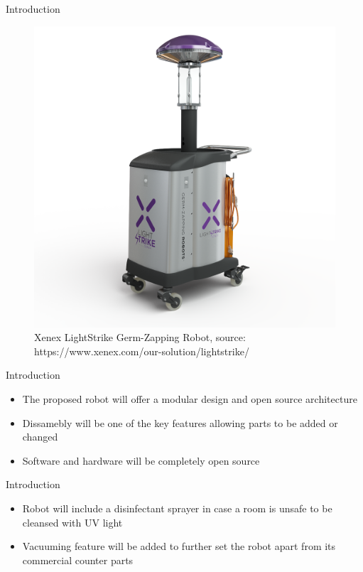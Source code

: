 \documentclass{beamer}
\begin{document}
\begin{frame}{Introduction}{}
\begin{figure}
	\centering
	\includegraphics[scale=0.15]{figs/img/xenexLightstrike}
	\caption{Xenex LightStrike Germ-Zapping Robot, source: https://www.xenex.com/our-solution/lightstrike/}
\end{figure}
\end{frame}

\begin{frame}{Introduction}{}
\begin{itemize}
	\item The proposed robot will offer a modular design and open source architecture
	\item Dissamebly will be one of the key features allowing parts to be added or changed
	\item Software and hardware will be completely open source
\end{itemize}
\end{frame}

\begin{frame}{Introduction}{}
\begin{itemize}
	\item Robot will include a disinfectant sprayer in case a room is unsafe to be cleansed with UV light
	\item Vacuuming feature will be added to further set the robot apart from its commercial counter parts
\end{itemize}
\end{frame}
\end{document}
